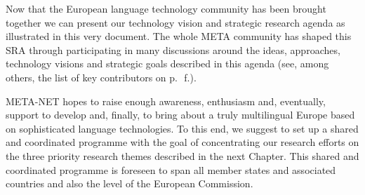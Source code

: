 \documentclass[10pt, plain]{../../metanetpaper}
\begin{document}
\begin{multicols}{2}
Now that the European language technology community has been brought together we can present our technology vision and strategic research agenda as illustrated in this very document. The whole META community has shaped this SRA through participating in many discussions around the ideas, approaches, technology visions and strategic goals described in this agenda (see, among others, the list of key contributors on p.~\pageref{sec:list-of-contributors}\,f.). 

META-NET hopes to raise enough awareness, enthusiasm and, eventually, support to develop and, finally, to bring about a truly multilingual Europe based on sophisticated language technologies. To this end, we suggest to set up a shared and coordinated programme with the goal of concentrating our research efforts on the three priority research themes described in the next Chapter. This shared and coordinated programme is foreseen to span all member states and associated countries and also the level of the European Commission. 
\end{multicols}

\clearpage


\label{sec:lt2020}
\end{document}

